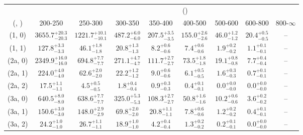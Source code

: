 \begin{table}[h!]
\tiny
\centering
{}
\begin{tabular}
{ccccccccc}
	\hline\hline
&	& \multicolumn{8}{c}{\scalht (\gev)} \\ 
	 (\njet,  \nb) & 200-250 & 250-300 & 300-350 & 350-400 & 400-500 & 500-600 & 600-800 & 800-$\infty$ \\ [0.8ex] 
\hline
	(1, 0) & $3655.7^{+ 20.3 }_{- 20.3 }$ & $1221.7^{+ 10.1 }_{- 10.1 }$ & $487.2^{+ 6.0 }_{- 6.0 }$ & $207.5^{+ 3.5 }_{- 3.5 }$ & $155.0^{+ 2.6 }_{- 2.6 }$ & $46.0^{+ 1.2 }_{- 1.2 }$ & $20.4^{+ 0.5 }_{- 0.5 }$ & -- \\[0.5ex] 
	(1, 1) & $127.8^{+ 3.3 }_{- 3.3 }$ & $46.1^{+ 1.8 }_{- 1.8 }$ & $20.8^{+ 1.3 }_{- 1.3 }$ & $8.2^{+ 0.6 }_{- 0.6 }$ & $7.4^{+ 0.6 }_{- 0.6 }$ & $1.9^{+ 0.2 }_{- 0.2 }$ & $1.1^{+ 0.1 }_{- 0.1 }$ & -- \\[0.5ex] 
	(2a, 0) & $2349.9^{+ 16.0 }_{- 16.0 }$ & $694.8^{+ 7.7 }_{- 7.7 }$ & $271.1^{+ 4.7 }_{- 4.7 }$ & $111.7^{+ 2.7 }_{- 2.7 }$ & $73.5^{+ 1.8 }_{- 1.8 }$ & $19.1^{+ 0.8 }_{- 0.8 }$ & $7.7^{+ 0.4 }_{- 0.4 }$ & -- \\[0.5ex] 
	(2a, 1) & $224.0^{+ 4.0 }_{- 4.0 }$ & $62.6^{+ 2.0 }_{- 2.0 }$ & $22.2^{+ 1.2 }_{- 1.2 }$ & $9.0^{+ 0.6 }_{- 0.6 }$ & $6.1^{+ 0.5 }_{- 0.5 }$ & $1.6^{+ 0.3 }_{- 0.3 }$ & $0.7^{+ 0.1 }_{- 0.1 }$ & -- \\[0.5ex] 
	(2a, 2) & $17.5^{+ 1.1 }_{- 1.1 }$ & $4.5^{+ 0.5 }_{- 0.5 }$ & $1.8^{+ 0.4 }_{- 0.4 }$ & $0.9^{+ 0.3 }_{- 0.3 }$ & $0.4^{+ 0.1 }_{- 0.1 }$ & $0.0^{+ 0.0 }_{- 0.0 }$ & $0.0^{+ 0.0 }_{- 0.0 }$ & -- \\[0.5ex] 
	(3a, 0) & $640.5^{+ 8.0 }_{- 8.0 }$ & $638.6^{+ 7.7 }_{- 7.7 }$ & $325.0^{+ 5.3 }_{- 5.3 }$ & $108.3^{+ 2.7 }_{- 2.7 }$ & $50.8^{+ 1.6 }_{- 1.6 }$ & $10.2^{+ 0.6 }_{- 0.6 }$ & $3.6^{+ 0.2 }_{- 0.2 }$ & -- \\[0.5ex] 
	(3a, 1) & $150.6^{+ 3.0 }_{- 3.0 }$ & $148.0^{+ 2.9 }_{- 2.9 }$ & $69.8^{+ 2.0 }_{- 2.0 }$ & $20.8^{+ 1.1 }_{- 1.1 }$ & $7.8^{+ 0.6 }_{- 0.6 }$ & $1.2^{+ 0.2 }_{- 0.2 }$ & $0.4^{+ 0.1 }_{- 0.1 }$ & -- \\[0.5ex] 
	(3a, 2) & $24.2^{+ 1.0 }_{- 1.0 }$ & $26.7^{+ 1.1 }_{- 1.1 }$ & $18.9^{+ 1.0 }_{- 1.0 }$ & $4.2^{+ 0.4 }_{- 0.4 }$ & $1.3^{+ 0.2 }_{- 0.2 }$ & $0.2^{+ 0.1 }_{- 0.1 }$ & $0.0^{+ 0.0 }_{- 0.0 }$ & -- \\[0.5ex] 

\end{tabular}
\end{table}
